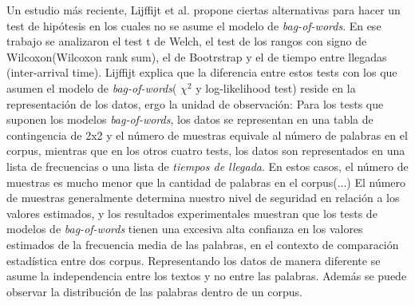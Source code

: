 Un estudio más reciente, Lijffijt et al. \cite{lijffijtsignificance} propone ciertas alternativas para hacer un test de hipótesis en los cuales no se asume el modelo de \textit{bag-of-words}.  En ese trabajo se analizaron el test t de Welch, el test de los rangos con signo de Wilcoxon(Wilcoxon rank sum), el de Bootrstrap y el de tiempo entre llegadas (inter-arrival time). Lijffijt explica que la diferencia entre estos tests con los que asumen el modelo de \textit{bag-of-words}( ${\chi}^2$ y log-likelihood test) reside en la representación de los datos, ergo la unidad de observación:
Para los tests que suponen los modelos \textit{bag-of-words}, los datos se representan en una tabla de contingencia de 2x2 y el número de muestras equivale al número de palabras en el corpus, mientras que en los otros cuatro tests, los datos son representados en una lista de frecuencias o una lista de \textit{tiempos de llegada}. En estos casos, el número de muestras es mucho menor que la cantidad de palabras en el corpus(...) El número de muestras generalmente determina nuestro nivel de seguridad en relación a los valores estimados, y los resultados experimentales muestran que los tests de modelos de \textit{bag-of-words} tienen una excesiva alta confianza en los valores estimados de la frecuencia media de las palabras, en el contexto de comparación estadística entre dos corpus. \cite{lijffijtsignificance}
Representando los datos de manera diferente se asume la independencia entre los textos y no entre las palabras. Además se puede observar la distribución de las palabras dentro de un corpus.



